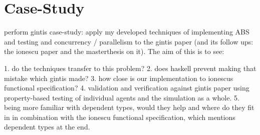 \section{Case-Study}
perform gintis case-study: apply my developed techniques of implementing ABS and testing and concurrency / parallelism to the gintis paper (and its follow ups: the ionescu paper and the masterthesis on it). 
The aim of this is to see: 

1. do the techniques transfer to this problem? 
2. does haskell prevent making that mistake which gintis made? 
3. how close is our implementation to ionescus functional specification? 
4. validation and verification against gintis paper using property-based testing of individual agents and the simulation as a whole. 
5. being more familiar with dependent types, would they help and where do they fit in in combination with the ionescu functional specification, which mentions dependent types at the end.